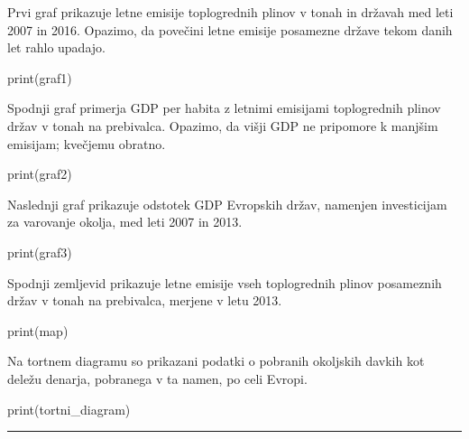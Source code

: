 \documentclass[]{article}
\begin{document}
Prvi graf prikazuje letne emisije toplogrednih plinov v tonah in državah
med leti 2007 in 2016. Opazimo, da povečini letne emisije posamezne
države tekom danih let rahlo upadajo.

print(graf1)

Spodnji graf primerja GDP per habita z letnimi emisijami toplogrednih
plinov držav v tonah na prebivalca. Opazimo, da višji GDP ne pripomore k
manjšim emisijam; kvečjemu obratno.

print(graf2)

Naslednji graf prikazuje odstotek GDP Evropskih držav, namenjen
investicijam za varovanje okolja, med leti 2007 in 2013.

print(graf3)

Spodnji zemljevid prikazuje letne emisije vseh toplogrednih plinov
posameznih držav v tonah na prebivalca, merjene v letu 2013.

print(map)

Na tortnem diagramu so prikazani podatki o pobranih okoljskih davkih kot
deležu denarja, pobranega v ta namen, po celi Evropi.

print(tortni\_diagram)

\begin{center}\rule{0.5\linewidth}{\linethickness}\end{center}
\end{document}
